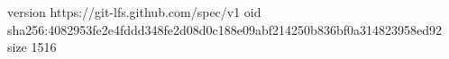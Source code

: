 version https://git-lfs.github.com/spec/v1
oid sha256:4082953fe2e4fddd348fe2d08d0c188e09abf214250b836bf0a314823958ed92
size 1516
